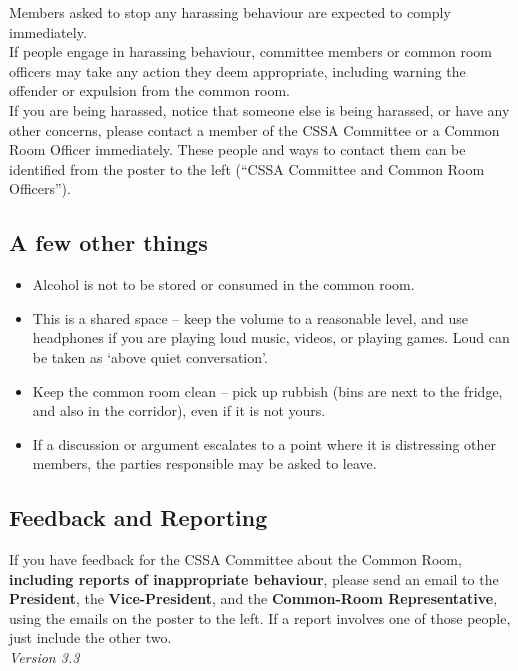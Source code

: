 \documentclass[a3paper,14pt]{extarticle}
\begin{document}
Members asked to stop any harassing behaviour are expected to comply
immediately.\\[1pt]
 
If people engage in harassing behaviour, committee members or common
room officers may take any action they deem appropriate, including
warning the offender or expulsion from the common room.\\[1pt]

If you are being harassed, notice that someone else is being harassed,
or have any other concerns, please contact a member of the CSSA
Committee or a Common Room Officer immediately. These people and ways to
contact them can be identified from the poster to the left (``CSSA
Committee and Common Room Officers'').

\subsection*{A few other things}\label{a-few-other-things}

\begin{itemize}
\item
  Alcohol is not to be stored or consumed in the common room.
\item
  This is a shared space -- keep the volume to a reasonable level, and
  use headphones if you are playing loud music, videos, or playing
  games. Loud can be taken as `above quiet conversation'.
\item
  Keep the common room clean -- pick up rubbish (bins are next to the
  fridge, and also in the corridor), even if it is not yours.
\item
  If a discussion or argument escalates to a point where it is
  distressing other members, the parties responsible may be asked to
  leave.
\end{itemize}

\subsection*{Feedback and Reporting}\label{feedback-and-reporting}

If you have feedback for the CSSA Committee about the Common Room,
\textbf{including reports of inappropriate behaviour}, please send an
email to the \textbf{President}, the \textbf{Vice-President}, and the
\textbf{Common-Room Representative}, using the emails on the poster to
the left. If a report involves one of those people, just include the
other two.\\[12pt]

\emph{Version 3.3}
\end{document}
